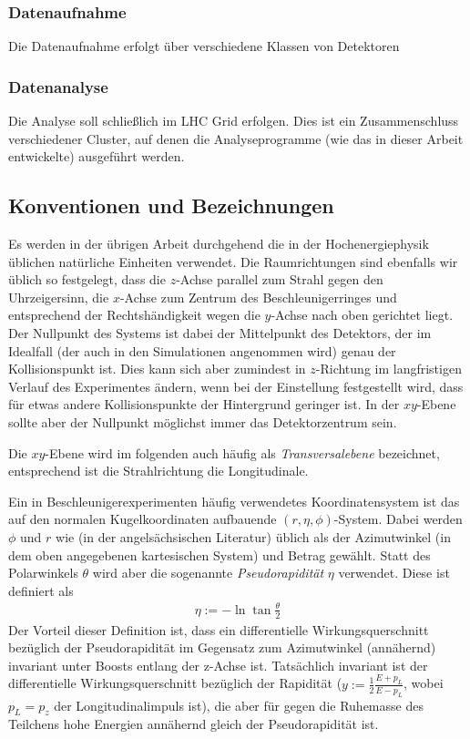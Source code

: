 \subsubsection{Datenaufnahme}
\label{cha:aufnahme}
Die Datenaufnahme erfolgt über verschiedene Klassen von Detektoren
\subsubsection{Datenanalyse}
Die Analyse soll schließlich im LHC Grid erfolgen. Dies ist ein Zusammenschluss
verschiedener Cluster, auf denen die Analyseprogramme (wie das in dieser Arbeit
entwickelte) ausgeführt werden.

\subsection{Konventionen und Bezeichnungen}
\label{cha:conv}
Es werden in der übrigen Arbeit durchgehend die in der Hochenergiephysik
üblichen natürliche Einheiten verwendet. Die Raumrichtungen sind ebenfalls wir
üblich so festgelegt, dass die $z$-Achse parallel zum Strahl gegen den
Uhrzeigersinn, die $x$-Achse zum Zentrum des Beschleunigerringes und entsprechend
der Rechtshändigkeit wegen die $y$-Achse nach oben gerichtet liegt. Der Nullpunkt
des Systems ist dabei der Mittelpunkt des Detektors, der im Idealfall (der auch
in den Simulationen angenommen wird) genau der Kollisionspunkt ist.  Dies kann
sich aber zumindest in $z$-Richtung im langfristigen Verlauf des Experimentes
ändern, wenn bei der Einstellung festgestellt wird, dass für etwas andere
Kollisionspunkte der Hintergrund geringer ist. In der $xy$-Ebene sollte aber der
Nullpunkt möglichst immer das Detektorzentrum sein.

Die $xy$-Ebene wird im folgenden auch häufig als \emph{Transversalebene}
bezeichnet, entsprechend ist die Strahlrichtung die Longitudinale.

Ein in Beschleunigerexperimenten häufig verwendetes Koordinatensystem ist das
auf den normalen Kugelkoordinaten aufbauende $(r, \eta, \phi)$-System.  Dabei
werden $\phi$ und $r$ wie (in der angelsächsischen Literatur) üblich als der
Azimutwinkel (in dem oben angegebenen kartesischen System) und Betrag gewählt.
Statt des Polarwinkels $\theta$ wird aber die sogenannte \emph{Pseudorapidität}
$\eta$ verwendet. Diese ist definiert als
\begin{align}
  \eta := -\ln{\tan{\frac \theta 2}}
\end{align}
Der Vorteil dieser Definition ist, dass ein differentielle Wirkungsquerschnitt
bezüglich der Pseudorapidität im Gegensatz zum Azimutwinkel (annähernd)
invariant unter Boosts entlang der z-Achse ist.  Tatsächlich invariant ist der
differentielle Wirkungsquerschnitt bezüglich der Rapidität ($y := \frac12
\frac{E + p_L}{E - p_L}$, wobei $p_L = p_z$ der Longitudinalimpuls ist), die
aber für gegen die Ruhemasse des Teilchens hohe Energien annähernd gleich der
Pseudorapidität ist.

